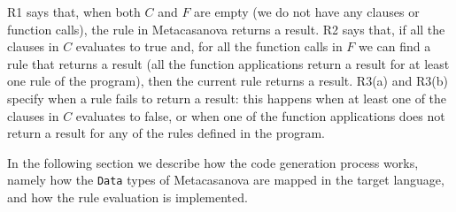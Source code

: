 R1 says that, when both $C$ and $F$ are empty (we do not have any clauses or function calls), the rule in Metacasanova returns a result. R2 says that, if all the clauses in $C$ evaluates to true and, for all the function calls in $F$ we can find a rule that returns a result (all the function applications return a result for at least one rule of the program), then the current rule returns a result. R3(a) and R3(b) specify when a rule fails to return a result: this happens when at least one of the clauses in $C$ evaluates to false, or when one of the function applications does not return a result for any of the rules defined in the program.

\vspace{0.2cm}
\noindent
In the following section we describe how the code generation process works, namely how the \texttt{Data} types of Metacasanova are mapped in the target language, and how the rule evaluation is implemented.
